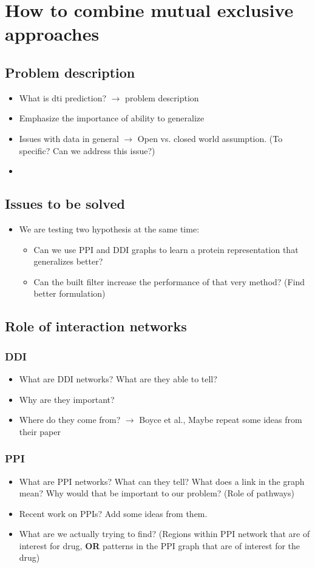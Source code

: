 \documentclass[]{article}
\begin{document}
\section{How to combine mutual exclusive approaches}
\subsection{Problem description}
	\begin{itemize}
		\item What is dti prediction? $\rightarrow$ problem description
		\item Emphasize the importance of ability to generalize
		\item Issues with data in general $\rightarrow$ Open vs. closed world assumption. (To specific? Can we address this issue?)
		\item 
	\end{itemize}
\subsection{Issues to be solved}
	\begin{itemize}
		\item We are testing two hypothesis at the same time:
			\begin{itemize}
				\item Can we use PPI and DDI graphs to learn a protein representation that generalizes better?
				\item Can the built filter increase the performance of that very method? (Find better formulation)
			\end{itemize}
	\end{itemize}
\subsection{Role of interaction networks}
\subsubsection{DDI}
	\begin{itemize}
		\item What are DDI networks? What are they able to tell?
		\item Why are they important?
		\item Where do they come from? $\rightarrow$ Boyce et al., Maybe repeat some ideas from their paper
	\end{itemize}
\subsubsection{PPI}
	\begin{itemize}
		\item What are PPI networks? What can they tell? What does a link in the graph mean? Why would that be important to our problem? (Role of pathways)
		\item Recent work on PPIs? Add some ideas from them.
		\item What are we actually trying to find? (Regions within PPI network that are of interest for drug, \textbf{OR} patterns in the PPI graph that are of interest for the drug)
	\end{itemize}
\end{document}
